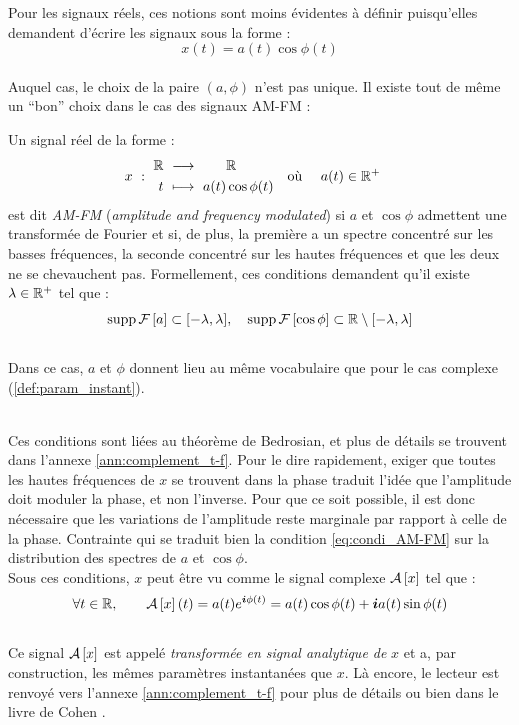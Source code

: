 Pour les signaux réels, ces notions sont moins évidentes à définir puisqu'elles demandent d'écrire les signaux sous la forme :
\[x(t) = a(t) \cos\phi(t)\]
\\
Auquel cas, le choix de la paire $(a,\phi)$ n'est pas unique. Il existe tout de même un ``bon'' choix dans le cas des signaux AM-FM :
\begin{definition}[Signal AM-FM]
	Un signal réel de la forme :
	\begin{align}
		x\ &:\ \begin{aligned}\mathbb{R}\ &\longrightarrow\qquad \mathbb{R} \\
			t\ &\longmapsto\ a(t) \cos\phi(t)
		\end{aligned}  &  \text{où }\quad a(t)\in\mathbb{R}^+\quad
	\end{align}
	est dit \emph{AM-FM} (\emph{amplitude and frequency modulated}) si $a$ et $\cos\phi$ admettent une transformée de Fourier et si, de plus, la première a un spectre concentré sur les basses fréquences, la seconde concentré sur les hautes fréquences et que les deux ne se chevauchent pas.
	Formellement, ces conditions demandent qu'il existe $\lambda\in\mathbb{R}^+$ tel que :
	\begin{equation}\label{eq:condi_AM-FM}
		\text{\normalfont supp}\, \mathcal{F}\left[a\right] \subset [-\lambda, \lambda],\quad \text{\normalfont supp}\, \mathcal{F}\left[\cos\phi\right] \subset \mathbb{R}\setminus[-\lambda,\lambda]
	\end{equation}
	\\
	Dans ce cas, $a$ et $\phi$ donnent lieu au même vocabulaire que pour le cas complexe (\cref{def:param_instant}).
\end{definition}
\skipl
\\
Ces conditions sont liées au théorème de Bedrosian, et plus de détails se trouvent dans l'annexe \ref{ann:complement_t-f}. Pour le dire rapidement, exiger que toutes les hautes fréquences de $x$ se trouvent dans la phase traduit l'idée que l'amplitude doit moduler la phase, et non l'inverse. Pour que ce soit possible, il est donc nécessaire que les variations de l'amplitude reste marginale par rapport à celle de la phase. Contrainte qui se traduit bien la condition \eqref{eq:condi_AM-FM} sur la distribution des spectres de $a$ et $\cos\phi$.
\\
Sous ces conditions, $x$ peut être vu comme le signal complexe $\mathcal{A}\left[x\right]$ tel que :
\begin{equation}
	\forall t\in\mathbb{R},\qquad \mathcal{A}\left[x\right](t) = a(t) e^{\boldsymbol{i} \phi(t)}= a(t)\cos\phi(t) + \boldsymbol{i} a(t)\sin\phi(t)
\end{equation}
\\
Ce signal $\mathcal{A}\left[x\right]$ est appelé \emph{transformée en signal analytique de} $x$ et a, par construction, les mêmes paramètres instantanées que $x$.
Là encore, le lecteur est renvoyé vers l'annexe \ref{ann:complement_t-f} pour plus de détails ou bien dans le livre de Cohen \cite{cohen_time_1995}.
\\


